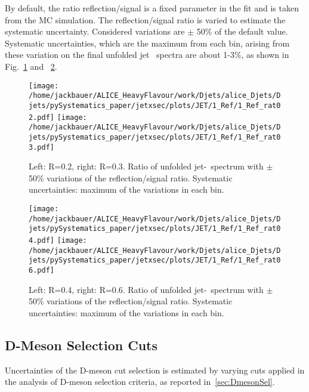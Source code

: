 By default, the ratio reflection/signal is a fixed parameter in the fit and is taken from the MC simulation. The reflection/signal ratio is varied to estimate the systematic uncertainty. Considered variations are $\pm$ 50\% of the default value. Systematic uncertainties, which are the maximum from each bin, arising from these variation on the final unfolded jet \pt\ spectra are  about 1-3\%, as shown in Fig.~\ref{fig:JetPtSys_Dzero_ReflR02R03} and ~\ref{fig:JetPtSys_Dzero_ReflR04R06}.
\begin{figure}[bth]
\begin{center}
\texttt{[image: /home/jackbauer/ALICE\_HeavyFlavour/work/Djets/alice\_Djets/Djets/pySystematics\_paper/jetxsec/plots/JET/1\_Ref/1\_Ref\_rat02.pdf]}
\texttt{[image: /home/jackbauer/ALICE\_HeavyFlavour/work/Djets/alice\_Djets/Djets/pySystematics\_paper/jetxsec/plots/JET/1\_Ref/1\_Ref\_rat03.pdf]}
\caption{Left: R=0.2, right: R=0.3. Ratio of unfolded jet-\pt\ spectrum with $\pm$50\% variations of the reflection/signal ratio. Systematic uncertainties: maximum of the variations in each bin.} 
\label{fig:JetPtSys_Dzero_ReflR02R03}
\end{center}
\end{figure}
\begin{figure}[bth]
\begin{center}
\texttt{[image: /home/jackbauer/ALICE\_HeavyFlavour/work/Djets/alice\_Djets/Djets/pySystematics\_paper/jetxsec/plots/JET/1\_Ref/1\_Ref\_rat04.pdf]}
\texttt{[image: /home/jackbauer/ALICE\_HeavyFlavour/work/Djets/alice\_Djets/Djets/pySystematics\_paper/jetxsec/plots/JET/1\_Ref/1\_Ref\_rat06.pdf]}
\caption{Left: R=0.4, right: R=0.6. Ratio of unfolded jet-\pt\ spectrum with $\pm$50\% variations of the reflection/signal ratio. Systematic uncertainties: maximum of the variations in each bin.} 
\label{fig:JetPtSys_Dzero_ReflR04R06}
\end{center}
\end{figure}
\subsection{D-Meson Selection Cuts}
Uncertainties of the D-meson cut selection is estimated by varying cuts applied in the analysis of D-meson selection criteria, as reported in~\ref{sec:DmesonSel}. 

